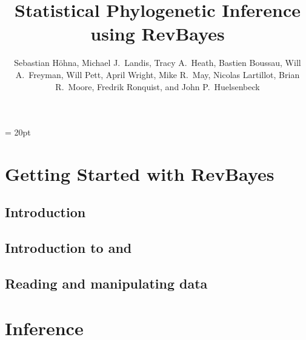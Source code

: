 \documentclass[11pt]{book}
\begin{document}
\renewcommand{\headrulewidth}{0.5pt}
\headsep = 20pt
\lhead{ }


\frontmatter

\title{\Huge \textbf{Statistical Phylogenetic Inference using RevBayes} }
\author{
Sebastian H{\"o}hna,
Michael J.~Landis,
Tracy A.~Heath,
Bastien Boussau,
Will A.~Freyman,
Will Pett,
April Wright,
Mike R.~May,
Nicolas Lartillot,
Brian R.~Moore,
Fredrik Ronquist, and
John P.~Huelsenbeck
}


\maketitle

\tableofcontents




\mainmatter

\def \GlobalResourcePath {./}

\part{Getting Started with RevBayes}

\chapter{Introduction}
\def \ResourcePath {RB_Getting_Started/}


\chapter{Introduction to \RevBayes and \Rev}
\def \ResourcePath {RB_Basics_Tutorial/}


\chapter{Reading and manipulating data}
\def \ResourcePath {RB_Data_Tutorial/}




\part{Inference}
\end{document}
